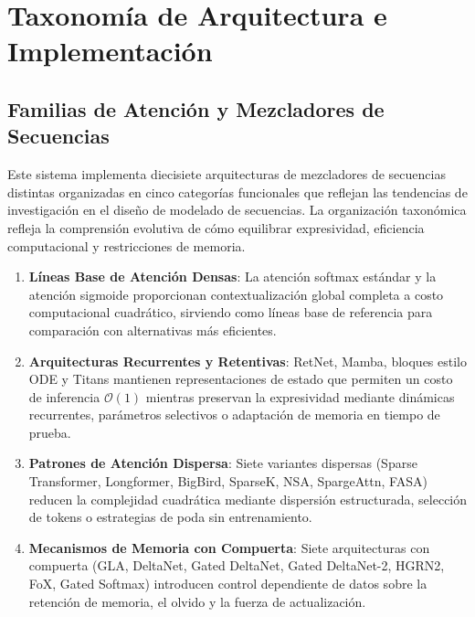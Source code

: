 \documentclass[11pt,a4paper]{article}
\begin{document}
\section{Taxonomía de Arquitectura e Implementación}
\label{sec:architecture-taxonomy}

\subsection{Familias de Atención y Mezcladores de Secuencias}
\label{sec:attention-families}

Este sistema implementa diecisiete arquitecturas de mezcladores de secuencias distintas organizadas en cinco categorías funcionales que reflejan las tendencias de investigación en el diseño de modelado de secuencias. La organización taxonómica refleja la comprensión evolutiva de cómo equilibrar expresividad, eficiencia computacional y restricciones de memoria.

\begin{enumerate}[leftmargin=*]
    \item \textbf{Líneas Base de Atención Densas}: La atención softmax estándar y la atención sigmoide proporcionan contextualización global completa a costo computacional cuadrático, sirviendo como líneas base de referencia para comparación con alternativas más eficientes.
    \item \textbf{Arquitecturas Recurrentes y Retentivas}: RetNet, Mamba, bloques estilo ODE y Titans mantienen representaciones de estado que permiten un costo de inferencia $\mathcal{O}(1)$ mientras preservan la expresividad mediante dinámicas recurrentes, parámetros selectivos o adaptación de memoria en tiempo de prueba.
    \item \textbf{Patrones de Atención Dispersa}: Siete variantes dispersas (Sparse Transformer, Longformer, BigBird, SparseK, NSA, SpargeAttn, FASA) reducen la complejidad cuadrática mediante dispersión estructurada, selección de tokens o estrategias de poda sin entrenamiento.
    \item \textbf{Mecanismos de Memoria con Compuerta}: Siete arquitecturas con compuerta (GLA, DeltaNet, Gated DeltaNet, Gated DeltaNet-2, HGRN2, FoX, Gated Softmax) introducen control dependiente de datos sobre la retención de memoria, el olvido y la fuerza de actualización.
\end{enumerate}
\end{document}
